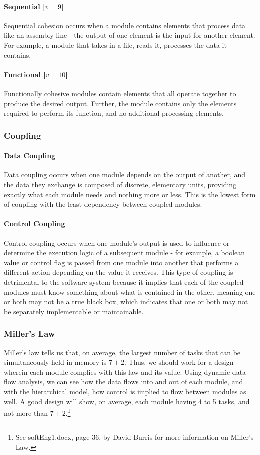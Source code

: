 \documentclass{article}
\begin{document}
			\paragraph{Sequential [$v=9$]} Sequential cohesion occurs when a module contains elements that process data like an assembly line - the output of one element is the input for another element. For example, a module that takes in a file, reads it, processes the data it contains. 
			\paragraph{Functional [$v=10$]} Functionally cohesive modules contain elements that all operate together to produce the desired output. Further, the module contains only the elements required to perform its function, and no additional processing elements.
			
		\subsubsection{Coupling}
			\paragraph{Data Coupling}
				Data coupling occurs when one module depends on the output of another, and the data they exchange is composed of discrete, elementary units, providing exactly what each module needs and nothing more or less. This is the lowest form of coupling with the least dependency between coupled modules. 
			\paragraph{Control Coupling}
				Control coupling occurs when one module's output is used to influence or determine the execution logic of a subsequent module - for example, a boolean value or control flag is passed from one module into another that performs a different action depending on the value it receives. This type of coupling is detrimental to the software system because it implies that each of the coupled modules must know something about what is contained in the other, meaning one or both may not be a true black box, which indicates that one or both may not be separately implementable or maintainable. 
		\subsubsection{Miller's Law}
			Miller's law tells us that, on average, the largest number of tasks that can be simultaneously held in memory is $7\pm2$. Thus, we should work for a design wherein each module complies with this law and its value. Using dynamic data flow analysis, we can see how the data flows into and out of each module, and with the hierarchical model, how control is implied to flow between modules as well. A good design will show, on average, each module having 4 to 5 tasks, and not more than $7\pm2$.\footnote{See softEng1.docx, page 36, by David Burris for more information on Miller's Law.}  
\end{document}
